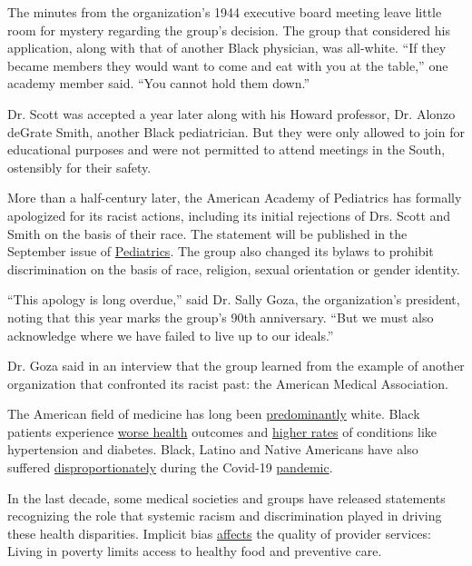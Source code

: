 The minutes from the organization's 1944 executive board meeting leave
little room for mystery regarding the group's decision. The group that
considered his application, along with that of another Black physician,
was all-white. ``If they became members they would want to come and eat
with you at the table,'' one academy member said. ``You cannot hold them
down.''

Dr. Scott was accepted a year later along with his Howard professor, Dr.
Alonzo deGrate Smith, another Black pediatrician. But they were only
allowed to join for educational purposes and were not permitted to
attend meetings in the South, ostensibly for their safety.

More than a half-century later, the American Academy of Pediatrics has
formally apologized for its racist actions, including its initial
rejections of Drs. Scott and Smith on the basis of their race. The
statement will be published in the September issue of
\href{https://www.aappublications.org/news/2020/07/29/letter072920}{Pediatrics}.
The group also changed its bylaws to prohibit discrimination on the
basis of race, religion, sexual orientation or gender identity.

``This apology is long overdue,'' said Dr. Sally Goza, the
organization's president, noting that this year marks the group's 90th
anniversary. ``But we must also acknowledge where we have failed to live
up to our ideals.''

Dr. Goza said in an interview that the group learned from the example of
another organization that confronted its racist past: the American
Medical Association.

The American field of medicine has long been
\href{https://www.aamc.org/data-reports/workforce/interactive-data/figure-18-percentage-all-active-physicians-race/ethnicity-2018}{predominantly}
white. Black patients experience
\href{https://www.brookings.edu/blog/usc-brookings-schaeffer-on-health-policy/2020/02/19/there-are-clear-race-based-inequalities-in-health-insurance-and-health-outcomes/}{worse
health} outcomes and
\href{https://www.ncbi.nlm.nih.gov/pmc/articles/PMC4108512/}{higher
rates} of conditions like hypertension and diabetes. Black, Latino and
Native Americans have also suffered
\href{https://www.cdc.gov/coronavirus/2019-ncov/community/health-equity/race-ethnicity.html}{disproportionately}
during the Covid-19
\href{https://www.nytimes3xbfgragh.onion/interactive/2020/07/05/us/coronavirus-latinos-african-americans-cdc-data.html}{pandemic}.

In the last decade, some medical societies and groups have released
statements recognizing the role that systemic racism and discrimination
played in driving these health disparities. Implicit bias
\href{https://www.nytimes3xbfgragh.onion/2020/01/13/upshot/bad-medicine-the-harm-that-comes-from-racism.html}{affects}
the quality of provider services: Living in poverty limits access to
healthy food and preventive care.


